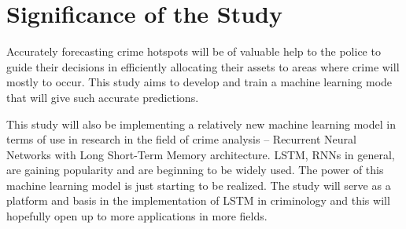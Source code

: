 \section{Significance of the Study} %

    Accurately forecasting crime hotspots will be of valuable help to the police to guide their decisions in efficiently allocating their assets to areas where crime will mostly to occur. This study aims to develop and train a machine learning mode that will give such accurate predictions.

    This study will also be implementing a relatively new machine learning model in terms of use in research in the field of crime analysis – Recurrent Neural Networks with Long Short-Term Memory architecture. LSTM, RNNs in general, are gaining popularity and are beginning to be widely used. The power of this machine learning model is just starting to be realized. The study will serve as a platform and basis in the implementation of LSTM in criminology and this will hopefully open up to more applications in more fields.